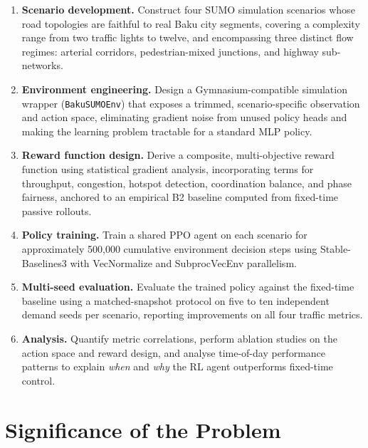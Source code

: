 \documentclass[12pt,oneside,a4paper]{report}
\newcommand{\ppo}{\textsc{PPO}}
\begin{document}
\begin{enumerate}[leftmargin=*, label=\textbf{O\arabic*.}]

  \item \textbf{Scenario development.}
        Construct four SUMO simulation scenarios whose road
        topologies are faithful to real Baku city segments, covering
        a complexity range from two traffic lights to twelve, and
        encompassing three distinct flow regimes: arterial corridors,
        pedestrian-mixed junctions, and highway sub-networks.

  \item \textbf{Environment engineering.}
        Design a Gymnasium-compatible simulation wrapper
        (\texttt{BakuSUMOEnv}) that exposes a trimmed, scenario-specific
        observation and action space, eliminating gradient noise from
        unused policy heads and making the learning problem tractable
        for a standard MLP policy.

  \item \textbf{Reward function design.}
        Derive a composite, multi-objective reward function using
        statistical gradient analysis, incorporating terms for
        throughput, congestion, hotspot detection, coordination
        balance, and phase fairness, anchored to an empirical B2
        baseline computed from fixed-time passive rollouts.

  \item \textbf{Policy training.}
        Train a shared \ppo{} agent on each scenario for approximately
        500{,}000 cumulative environment decision steps using
        Stable-Baselines3 with VecNormalize and SubprocVecEnv
        parallelism.

  \item \textbf{Multi-seed evaluation.}
        Evaluate the trained policy against the fixed-time baseline
        using a matched-snapshot protocol on five to ten independent
        demand seeds per scenario, reporting improvements on all four
        traffic metrics.

  \item \textbf{Analysis.}
        Quantify metric correlations, perform ablation studies on
        the action space and reward design, and analyse time-of-day
        performance patterns to explain \emph{when} and \emph{why}
        the RL agent outperforms fixed-time control.

\end{enumerate}

\section{Significance of the Problem}
\label{sec:sig}
\end{document}
